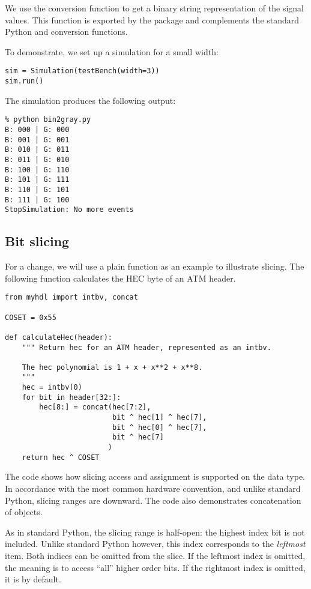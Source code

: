 We use the conversion function  to get a binary
string representation of the signal values. This function is exported
by the  package and complements the standard Python
 and  conversion functions.

To demonstrate, we set up a simulation for a small width: 

\begin{verbatim}
sim = Simulation(testBench(width=3))
sim.run()
\end{verbatim}

The simulation produces the following output:

\begin{verbatim}
% python bin2gray.py
B: 000 | G: 000
B: 001 | G: 001
B: 010 | G: 011
B: 011 | G: 010
B: 100 | G: 110
B: 101 | G: 111
B: 110 | G: 101
B: 111 | G: 100
StopSimulation: No more events
\end{verbatim}

\subsection{Bit slicing \label{intro-slicing}}

For a change, we will use a plain function as an example to illustrate
slicing.  The following function calculates the HEC byte of an ATM
header.

\begin{verbatim}
from myhdl import intbv, concat

COSET = 0x55

def calculateHec(header):
    """ Return hec for an ATM header, represented as an intbv.

    The hec polynomial is 1 + x + x**2 + x**8.
    """
    hec = intbv(0)
    for bit in header[32:]:
        hec[8:] = concat(hec[7:2],
                         bit ^ hec[1] ^ hec[7],
                         bit ^ hec[0] ^ hec[7],
                         bit ^ hec[7]
                        )
    return hec ^ COSET
\end{verbatim}

The code shows how slicing access and assignment is supported on the
 data type. In accordance with the most common hardware
convention, and unlike standard Python, slicing ranges are
downward. The code also demonstrates concatenation of 
objects.

As in standard Python, the slicing range is half-open: the highest
index bit is not included. Unlike standard Python however, this index
corresponds to the \emph{leftmost} item. Both indices can be omitted
from the slice. If the leftmost index is omitted, the meaning is to
access ``all'' higher order bits.  If the rightmost index is omitted,
it is  by default.

